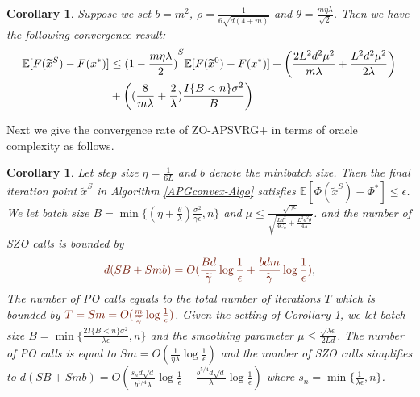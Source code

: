 \documentclass{article}
\newcommand*{\E}{\mathbb{E}}
\newtheorem{corollary}[theorem]{Corollary}
\theoremstyle{definition}
\theoremstyle{remark}
\begin{document}
\begin{corollary}\label{sc-corr}
  Suppose we set {\color{brown}$b=m^2$}, {\color{Brown}$\rho = \frac{1}{6\sqrt{d(4+m)}}$ }and $\theta = \frac{m\eta\lambda}{\sqrt{2}}$. Then we have the following convergence result:
\begin{align}
\E[F(\widetilde{x}^S) - F(x^*)] & \leq {(1-\frac{m\eta\lambda}{2})}^{S} \E[F(\widetilde{x}^0) - F(x^*)]+\left(\frac{2L^2d^2\mu^2}{m\lambda}+\frac{ L^2d^2\mu^2}{2\lambda}\right)\notag\\
&+ \left((\frac{8}{m\lambda}+\frac{2}{\lambda})\frac{I\{B < n\} \sigma ^2}{B}\right)
\end{align}
\end{corollary}
{\color{DarkOrchid}
Next we give the convergence rate of ZO-APSVRG+ in terms of oracle complexity as follows.
}
\begin{corollary}\label{SC-CorI}
Let step size $\eta = \frac{1}{6L}$ and $b$ denote the minibatch size. Then the final iteration point $\tilde{x}^S$ in Algorithm \ref{APGconvex-Algo} satisfies $\E[\Phi(\tilde{x}^S) - \Phi^*]\leq \epsilon$. We let batch size $B = \min\{(\eta+\frac{\theta}{\lambda})\frac{\sigma ^2}{\gamma\epsilon}, n\}$ and {\color{Brown} $\mu \leq \frac{\sqrt{\gamma\epsilon}}{\sqrt{\frac{Ld^2}{4C_{\eta}}+\frac{ L^2d^2\theta}{4\lambda}}}$}. and the number of SZO calls is bounded by
\[
{\color{Brown}d(SB+Smb) = O( \frac{Bd}{\widetilde{\gamma}}\log\frac{1}{\epsilon}+\frac{bdm}{\widetilde{\gamma}}\log\frac{1}{\epsilon})},
\]
The number of PO calls equals to the total number of iterations $T$ which is bounded by ${\color{Brown} T = Sm = O(\frac{m}{\widetilde{\gamma}}\log\frac{1}{\epsilon})}$. Given the setting  of Corollary \ref{SC-CorI}, we let batch size $B = \min\{\frac{2I\{B < n\} \sigma ^2}{\lambda\epsilon}, n\}$ and the smoothing parameter $\mu \leq \frac{\sqrt{\lambda\epsilon}}{2Ld}$. The number of PO calls is equal to $Sm = O(\frac{1}{\eta\lambda}\log\frac{1}{\epsilon})$ and the number of SZO calls  simplifies to 
{\color{blue}$d(S B+Smb) = O(\frac{s_nd\sqrt{d}}{b^{1/4} \lambda}\log\frac{1}{\epsilon}+\frac{b^{5/4} d\sqrt{d}}{\lambda}\log\frac{1}{\epsilon})$} where $s_n = \min\{\frac{1}{\lambda \epsilon},n\}$.
\end{corollary}
\end{document}
